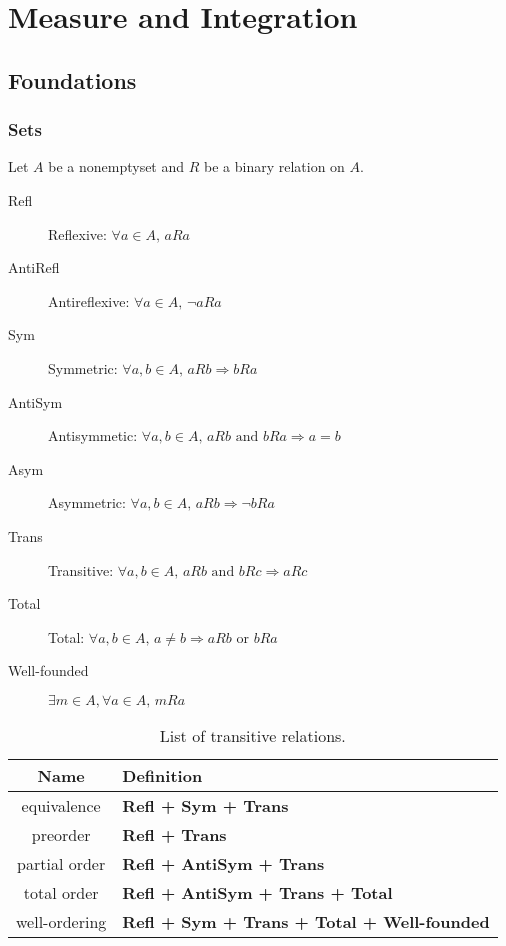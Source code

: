 \part{Measure and Integration}

\chapter{Foundations}

\section{Sets}
Let \(A\) be a nonemptyset and \(R\) be a binary relation on \(A\).

\begin{description}
    \item[Refl] Reflexive: \(\forall a \in A,\, aRa\)
    \item[AntiRefl] Antireflexive: \(\forall a \in A,\, \neg aRa\)
    \item[Sym] Symmetric: \(\forall a,b \in A,\, aRb \Rightarrow bRa\)
    \item[AntiSym] Antisymmetic: \(\forall a,b \in A,\, aRb \mbox{ and } bRa \Rightarrow a=b\)
    \item[Asym] Asymmetric: \(\forall a,b \in A,\, aRb \Rightarrow \neg bRa\)
    \item[Trans] Transitive: \(\forall a,b \in A,\, aRb \mbox{ and } bRc \Rightarrow aRc\)
    \item[Total] Total: \(\forall a,b \in A,\, a \neq b \Rightarrow aRb \mbox{ or } bRa \)
    \item[Well-founded] \(\exists m \in A, \forall a \in A,\, mRa \)    
\end{description}

\begin{table}
\begin{centering}
    \begin{tabular}{ c l }
    \hline
    Name & Definition \\
    \hline
    equivalence & {\bf Refl + Sym + Trans} \\
    preorder & {\bf Refl + Trans} \\
    partial order & {\bf Refl + AntiSym + Trans} \\
    total order & {\bf Refl + AntiSym + Trans + Total} \\
    well-ordering & {\bf Refl + Sym + Trans + Total + Well-founded} \\
    \hline
    \end{tabular}
\end{centering}
    \caption{List of transitive relations.}
\end{table}

